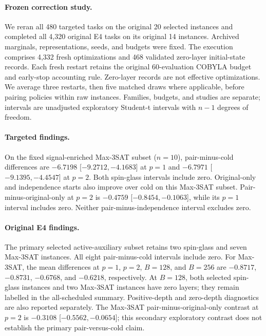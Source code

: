 \paragraph{Frozen correction study.}
We reran all 480 targeted tasks on the original 20 selected instances and
completed all 4,320 original E4 tasks on its original 14 instances.
Archived marginals, representations, seeds, and budgets were fixed.
The execution comprises 4,332 fresh optimizations and 468 validated
zero-layer initial-state records. Each fresh restart retains the original
60-evaluation COBYLA budget and early-stop accounting rule. Zero-layer
records are not effective optimizations. We average three restarts, then
five matched draws where applicable, before pairing policies within raw
instances. Families, budgets, and studies are separate; intervals are
unadjusted exploratory Student-t intervals with $n-1$ degrees of freedom.

\paragraph{Targeted findings.}
On the fixed signal-enriched Max-3SAT subset ($n=10$), pair-minus-cold
differences are $-6.7198$ [$-9.2712,-4.1683$] at $p=1$ and $-6.7971$
[$-9.1395,-4.4547$] at $p=2$. Both spin-glass intervals include zero.
Original-only and independence starts also improve over cold on this
Max-3SAT subset. Pair-minus-original-only at $p=2$ is $-0.4759$
[$-0.8454,-0.1063$], while its $p=1$ interval includes zero.
Neither pair-minus-independence interval excludes zero.

\paragraph{Original E4 findings.}
The primary selected active-auxiliary subset retains two spin-glass and
seven Max-3SAT instances. All eight pair-minus-cold intervals include zero.
For Max-3SAT, the mean differences at $p=1$, $p=2$, $B=128$, and $B=256$
are $-0.8717$, $-0.8731$, $-0.6768$, and $-0.6218$, respectively.
At $B=128$, both selected spin-glass instances and two Max-3SAT instances
have zero layers; they remain labelled in the all-scheduled summary.
Positive-depth and zero-depth diagnostics are also reported separately.
The Max-3SAT pair-minus-original-only contrast at $p=2$ is $-0.3108$
[$-0.5562,-0.0654$]; this secondary exploratory contrast does not establish
the primary pair-versus-cold claim.

